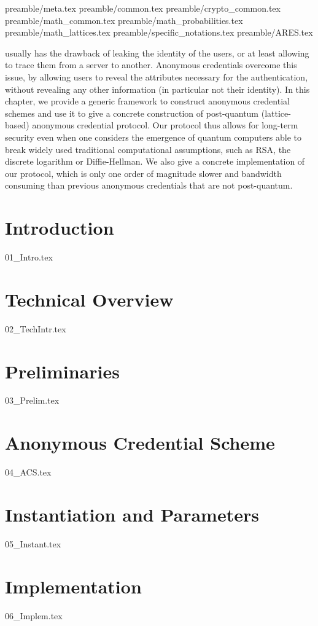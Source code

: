 {

{preamble/meta.tex}
{preamble/common.tex}
{preamble/crypto_common.tex}
{preamble/math_common.tex}
{preamble/math_probabilities.tex}
{preamble/math_lattices.tex}
{preamble/specific_notations.tex}
{preamble/ARES.tex}


 \label{cha:groupsig}


 usually has the drawback of 
leaking the identity of the users, or at least allowing to trace them from a 
server to another. Anonymous credentials overcome this issue, by allowing 
users to reveal the attributes necessary for the authentication, without 
revealing any other information (in particular not their identity). In this 
chapter, we provide a generic framework to construct anonymous credential 
schemes and use it to give a concrete construction of post-quantum 
(lattice-based) anonymous credential protocol. Our protocol thus allows for 
long-term security even when one considers the emergence of quantum computers 
able to break widely used traditional computational assumptions, such as RSA, 
the discrete logarithm or Diffie-Hellman. We also give a concrete 
implementation of our protocol, which is only one order of magnitude slower 
and bandwidth consuming than previous anonymous credentials that are not 
post-quantum.

\section{Introduction}\label{sec:introduction}
{01_Intro.tex}

\section{Technical Overview}\label{sec:technical_details}
{02_TechIntr.tex}

\section{Preliminaries}\label{sec:preliminaries}
{03_Prelim.tex}

\section{Anonymous Credential Scheme}\label{sec:anonymous_credential_scheme}
{04_ACS.tex}

\section{Instantiation and Parameters}\label{sec:instanciation_parameters}
\label{sec:Instanciation}
{05_Instant.tex}

\section{Implementation}\label{sec:implementation}
{06_Implem.tex}

\iffalse


\fi

}

